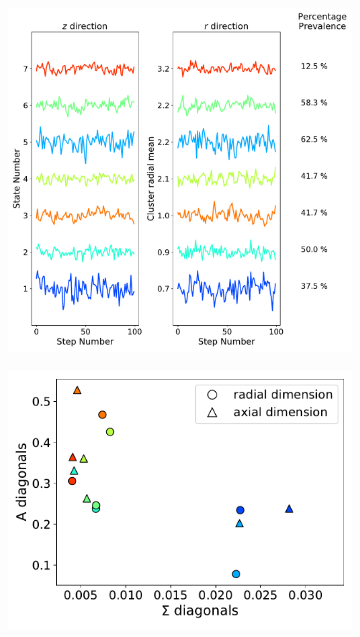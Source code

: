 \documentclass[journal=jpcbfk,manuscript=article]{achemso}
\begin{document}
  \begin{figure}
  \centering
  \begin{subfigure}{0.6\textwidth}
  \includegraphics[width=\textwidth]{common_states_MET.pdf}
  \caption{}\label{fig:common_states_MET_lines}
  \end{subfigure}
  \begin{subfigure}{0.35\textwidth}
  \includegraphics[width=\textwidth]{A_sigma_scatter_MET.pdf}

\end{subfigure}
\end{figure}
\end{document}
